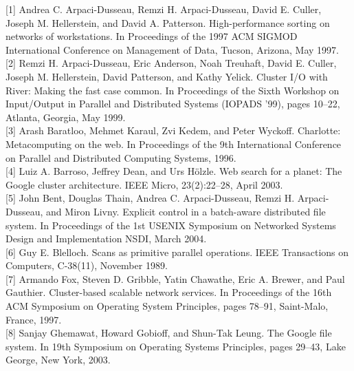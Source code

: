 \documentclass[
]{article}
\begin{document}
{[}1{]} Andrea C. Arpaci-Dusseau, Remzi H. Arpaci-Dusseau, David E.
Culler, Joseph M. Hellerstein, and David A. Patterson. High-performance
sorting on networks of workstations. In Proceedings of the 1997 ACM
SIGMOD International Conference on Management of Data, Tucson, Arizona,
May 1997.\\
{[}2{]} Remzi H. Arpaci-Dusseau, Eric Anderson, Noah Treuhaft, David E.
Culler, Joseph M. Hellerstein, David Patterson, and Kathy Yelick.
Cluster I/O with River: Making the fast case common. In Proceedings of
the Sixth Workshop on Input/Output in Parallel and Distributed Systems
(IOPADS '99), pages 10--22, Atlanta, Georgia, May 1999.\\
{[}3{]} Arash Baratloo, Mehmet Karaul, Zvi Kedem, and Peter Wyckoff.
Charlotte: Metacomputing on the web. In Proceedings of the 9th
International Conference on Parallel and Distributed Computing Systems,
1996.\\
{[}4{]} Luiz A. Barroso, Jeffrey Dean, and Urs Hölzle. Web search for a
planet: The Google cluster architecture. IEEE Micro, 23(2):22--28, April
2003.\\
{[}5{]} John Bent, Douglas Thain, Andrea C. Arpaci-Dusseau, Remzi H.
Arpaci-Dusseau, and Miron Livny. Explicit control in a batch-aware
distributed file system. In Proceedings of the 1st USENIX Symposium on
Networked Systems Design and Implementation NSDI, March 2004.\\
{[}6{]} Guy E. Blelloch. Scans as primitive parallel operations. IEEE
Transactions on Computers, C-38(11), November 1989.\\
{[}7{]} Armando Fox, Steven D. Gribble, Yatin Chawathe, Eric A. Brewer,
and Paul Gauthier. Cluster-based scalable network services. In
Proceedings of the 16th ACM Symposium on Operating System Principles,
pages 78--91, Saint-Malo, France, 1997.\\
{[}8{]} Sanjay Ghemawat, Howard Gobioff, and Shun-Tak Leung. The Google
file system. In 19th Symposium on Operating Systems Principles, pages
29--43, Lake George, New York, 2003.
\end{document}
